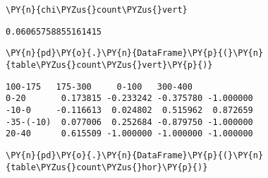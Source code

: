     \begin{tcolorbox}[breakable, size=fbox, boxrule=1pt, pad at break*=1mm,colback=cellbackground, colframe=cellborder]
\begin{Verbatim}[commandchars=\\\{\}]
\PY{n}{chi\PYZus{}count\PYZus{}vert}
\end{Verbatim}
\end{tcolorbox}

            \begin{tcolorbox}[breakable, size=fbox, boxrule=.5pt, pad at break*=1mm, opacityfill=0]
\begin{Verbatim}[commandchars=\\\{\}]
0.06065758855161415
\end{Verbatim}
\end{tcolorbox}
        
    \begin{tcolorbox}[breakable, size=fbox, boxrule=1pt, pad at break*=1mm,colback=cellbackground, colframe=cellborder]
\begin{Verbatim}[commandchars=\\\{\}]
\PY{n}{pd}\PY{o}{.}\PY{n}{DataFrame}\PY{p}{(}\PY{n}{table\PYZus{}count\PYZus{}vert}\PY{p}{)}
\end{Verbatim}
\end{tcolorbox}

            \begin{tcolorbox}[breakable, size=fbox, boxrule=.5pt, pad at break*=1mm, opacityfill=0]
\begin{Verbatim}[commandchars=\\\{\}]
            100-175   175-300     0-100   300-400
0-20       0.173815 -0.233242 -0.375780 -1.000000
-10-0     -0.116613  0.024802  0.515962  0.872659
-35-(-10)  0.077006  0.252684 -0.879750 -1.000000
20-40      0.615509 -1.000000 -1.000000 -1.000000
\end{Verbatim}
\end{tcolorbox}
        
    \begin{tcolorbox}[breakable, size=fbox, boxrule=1pt, pad at break*=1mm,colback=cellbackground, colframe=cellborder]
\begin{Verbatim}[commandchars=\\\{\}]
\PY{n}{pd}\PY{o}{.}\PY{n}{DataFrame}\PY{p}{(}\PY{n}{table\PYZus{}count\PYZus{}hor}\PY{p}{)}
\end{Verbatim}
\end{tcolorbox}

